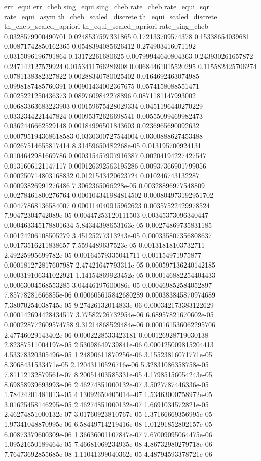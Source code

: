 err_equi	err_cheb	sing_equi	sing_cheb	rate_cheb	rate_equi_sqr	rate_equi_asym	th_cheb_scaled_discrete	th_equi_scaled_discrete	th_cheb_scaled_apriori	th_equi_scaled_apriori	rate_sing_cheb
0.0328579900490701	0.0248537597331865	0.172133709574378	0.15338654039681	0.00871742850162365	0.0548394085626412	0.274903416071192	0.0315096196791864	0.13172261680625	0.00799944640804363	0.243930261657872	0.247142127579924
0.0153411766286908	0.00684461015520295	0.115582425706274	0.0781138382327822	0.00288340780025402	0.0164692463074985	0.0998187485760391	0.00901434002367675	0.0574158088551471	0.0025221250436373	0.0897609842278896	0.0871181147993002
0.00683363683223903	0.00159675428029334	0.0451196440270229	0.0332344221447824	0.00095372626698541	0.00555099469982473	0.0362446662529148	0.00184996501843603	0.0236965690092632	0.000795194368618583	0.0330300727544004	0.0300888627453488
0.00267514655817414	8.31459650482268e-05	0.013195700924131	0.0104642981669786	0.000315457907916387	0.00204194227427547	0.0131606121147117	0.000126392563195286	0.00937366901799056	0.000250714803168832	0.0121543420623724	0.010246743132287
0.00093826991276486	7.3062365066228e-05	0.00328896977548809	0.00278461800276764	0.000104341984814502	0.000804973192951702	0.00477868136584007	0.000114040915962623	0.00357522429978524	7.90472304742089e-05	0.00447253120111503	0.00345373096340447
0.000463345178801634	5.84344398653163e-05	0.00274869735831185	0.00124206108505279	3.45125277313243e-05	0.000335807356808637	0.00173516211838657	7.5594489637523e-05	0.00131818103732711	2.49225995699782e-05	0.00164579335041711	0.001154971975877
0.000181272817607987	2.47421647793311e-05	0.000597136240142185	0.000319106341022921	1.14154869923452e-05	0.000146882254404433	0.00063004568553285	3.04446197600086e-05	0.000469852584052897	7.85778281666855e-06	0.000605615842680289	0.000383845870974689
7.38070254038745e-05	9.27426132014833e-06	0.000342173383122629	0.000142694428434517	3.77582726732954e-06	6.68957821670602e-05	0.000228772609574758	9.31214868529484e-06	0.000161536062295706	2.47746029143402e-06	0.0002228533423181	0.000126928719030138
2.82387511004197e-05	2.53098649739841e-06	0.000125009815204413	4.53378320305496e-05	1.24890611870256e-06	3.15523816071771e-05	8.3068431533471e-05	2.12043110526716e-06	5.32831086358758e-05	7.81112132879561e-07	8.20051403585331e-05	4.17985156054243e-05
8.69858939693993e-06	2.46274851000132e-07	3.5027787446336e-05	1.78424201481013e-05	4.13092650405014e-07	1.53463000758972e-05	3.01625458146295e-05	2.46274851000132e-07	1.6691034572821e-05	2.46274851000132e-07	3.01760923810767e-05	1.37166669356995e-05
1.97341048870995e-06	6.58449714219416e-08	1.01291852802157e-05	6.00873379600309e-06	1.36636001107847e-07	7.67009095064475e-06	1.09521650189464e-05	7.46681069234935e-08	4.86732980279718e-06	7.76473692855685e-08	1.11041399040362e-05	4.48794593378721e-06
